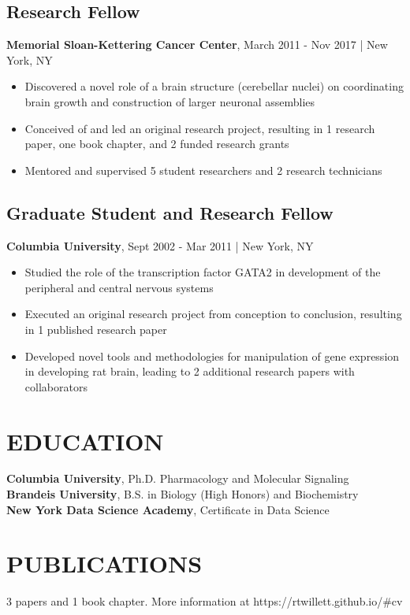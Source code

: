 \documentclass[11pt]{article}
\newenvironment{myitemize}
{ \begin{itemize}
	\setlength{\itemsep}{0pt}
	\setlength{\parskip}{0pt}
	\setlength{\parsep}{0pt}     }
{ \end{itemize}                  }
\begin{document}
\subsection*{Research Fellow}
{\bfseries Memorial Sloan-Kettering Cancer Center}, March 2011 - Nov 2017 | New York, NY
\begin{myitemize}
	\item Discovered a novel role of a brain structure (cerebellar nuclei) on coordinating brain
	growth and construction of larger neuronal assemblies
	\item Conceived of and led an original research project, resulting in 1 research paper, one
	book chapter, and 2 funded research grants
	\item Mentored and supervised 5 student researchers and 2 research technicians
\end{myitemize}

\subsection*{Graduate Student and Research Fellow}
{\bfseries Columbia University}, Sept 2002 - Mar 2011 | New York, NY
\begin{myitemize}
	\item Studied the role of the transcription factor GATA2 in development of the peripheral and
	central nervous systems
	\item Executed an original research project from conception to conclusion, resulting in 1
	published research paper
	\item Developed novel tools and methodologies for manipulation of gene expression in
	developing rat brain, leading to 2 additional research papers with collaborators
\end{myitemize}

\section*{EDUCATION}
{\bfseries Columbia University}, Ph.D. Pharmacology and Molecular Signaling \\
{\bfseries Brandeis University}, B.S. in Biology (High Honors) and Biochemistry \\
{\bfseries New York Data Science Academy}, Certificate in Data Science

\section*{PUBLICATIONS}
3 papers and 1 book chapter. More information at https://rtwillett.github.io/\#cv
\end{document}
